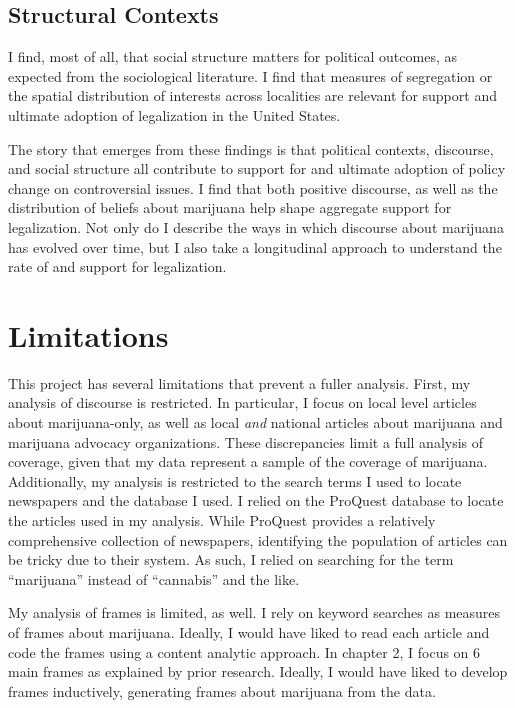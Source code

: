 \subsection{Structural Contexts}

I find, most of all, that social structure matters for political outcomes, as expected from the sociological literature. I find that measures of segregation or the spatial distribution of interests across localities are relevant for support and ultimate adoption of legalization in the United States. 
 
 
The story that emerges from these findings is that political contexts, discourse, and social structure all contribute to support for and ultimate adoption of policy change on controversial issues. I find that both positive discourse, as well as the distribution of beliefs about marijuana help shape aggregate support for legalization. Not only do I describe the ways in which discourse about marijuana has evolved over time, but I also take a longitudinal approach to understand the rate of and support for legalization. 

\section{Limitations}

This project has several limitations that prevent a fuller analysis. First, my analysis of discourse is restricted. In particular, I focus on local level articles about marijuana-only, as well as local \textit{and} national articles about marijuana and marijuana advocacy organizations. These discrepancies limit a full analysis of coverage, given that my data represent a sample of the coverage of marijuana. Additionally, my analysis is restricted to the search terms I used to locate newspapers and the database I used. I relied on the ProQuest database to locate the articles used in my analysis. While ProQuest provides a relatively comprehensive collection of newspapers, identifying the population of articles can be tricky due to their system. As such, I relied on searching for the term ``marijuana'' instead of ``cannabis'' and the like. 

My analysis of frames is limited, as well. I rely on keyword searches as measures of frames about marijuana. Ideally, I would have liked to read each article and code the frames using a content analytic approach. In chapter 2, I focus on 6 main frames as explained by prior research. Ideally, I would have liked to develop frames inductively, generating frames about marijuana from the data. 

